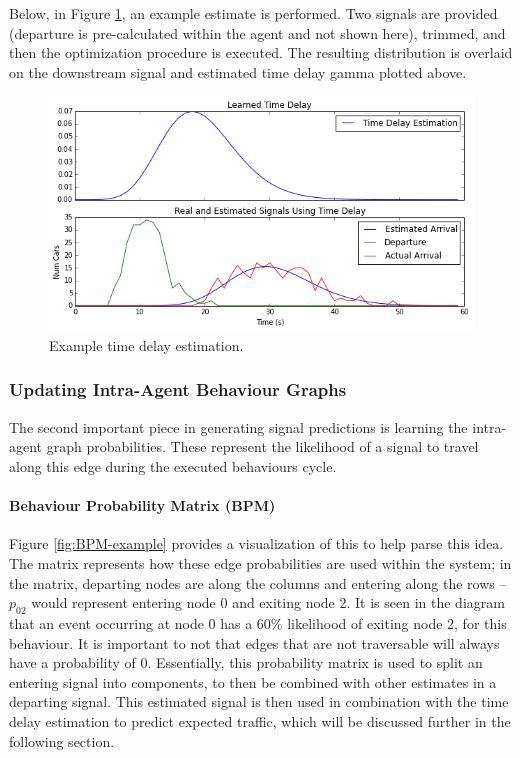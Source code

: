 \documentclass{report}
\begin{document}
Below, in Figure \ref{fig:time-delay-est}, an example estimate is performed. 
Two signals are provided (departure is pre-calculated within the agent and not shown here), trimmed, and then the optimization procedure is executed. 
The resulting distribution is overlaid on the downstream signal and estimated time delay gamma plotted above.

\begin{figure}[H]
  \begin{centering}
    \includegraphics[scale=0.75]{figures/time-delay-est.png}
    \caption{Example time delay estimation.}
    \label{fig:time-delay-est}
  \end{centering}
\end{figure}


\subsubsection{Updating Intra-Agent Behaviour Graphs}

The second important piece in generating signal predictions is learning the intra-agent graph probabilities. 
These represent the likelihood of a signal to travel along this edge during the executed behaviours cycle.

\paragraph{Behaviour Probability Matrix (BPM)}
Figure \ref{fig:BPM-example} provides a visualization of this to help parse this idea. 
The matrix represents how these edge probabilities are used within the system; in the matrix, departing nodes are along the columns and entering along the rows -- $p_{02}$ would represent entering node 0 and exiting node 2. 
It is seen in the diagram that an event occurring at node 0 has a 60\% likelihood of exiting node 2, for this behaviour.
 It is important to not that edges that are not traversable will always have a probability of 0. 
Essentially, this probability matrix is used to split an entering signal into components, to then be combined with other estimates in a departing signal. 
This estimated signal is then used in combination with the time delay estimation to predict expected traffic, which will be discussed further in the following section.
\end{document}
